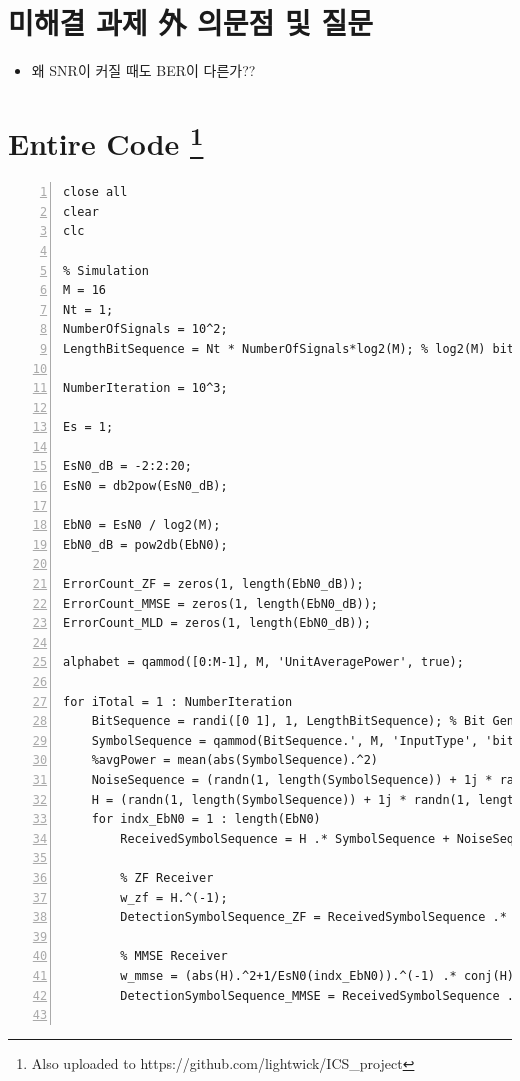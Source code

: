 \documentclass{article}
\begin{document}
\section{미해결 과제 外 의문점 및 질문}
\begin{itemize}
  \item{왜 SNR이 커질 때도 BER이 다른가??}
\end{itemize}
\section[Entire Code]{Entire Code \footnote{Also uploaded to https://github.com/lightwick/ICS\_project}}
\begin{lstlisting}[style=Matlab-editor, frame=single, numbers=left,]
close all
clear
clc

% Simulation
M = 16
Nt = 1;
NumberOfSignals = 10^2;
LengthBitSequence = Nt * NumberOfSignals*log2(M); % log2(M) bits per signal

NumberIteration = 10^3;

Es = 1;

EsN0_dB = -2:2:20;
EsN0 = db2pow(EsN0_dB);

EbN0 = EsN0 / log2(M);
EbN0_dB = pow2db(EbN0);

ErrorCount_ZF = zeros(1, length(EbN0_dB));
ErrorCount_MMSE = zeros(1, length(EbN0_dB));
ErrorCount_MLD = zeros(1, length(EbN0_dB));

alphabet = qammod([0:M-1], M, 'UnitAveragePower', true);

for iTotal = 1 : NumberIteration
    BitSequence = randi([0 1], 1, LengthBitSequence); % Bit Generation (BitSequence = rand(1, LengthBitSequence) > 0.5;)
    SymbolSequence = qammod(BitSequence.', M, 'InputType', 'bit', 'UnitAveragePower', 1).';
    %avgPower = mean(abs(SymbolSequence).^2)
    NoiseSequence = (randn(1, length(SymbolSequence)) + 1j * randn(1, length(SymbolSequence))) / sqrt(2); % Noise (n) Generation
    H = (randn(1, length(SymbolSequence)) + 1j * randn(1, length(SymbolSequence))) ./ sqrt(2); % Channel (h) Generation
    for indx_EbN0 = 1 : length(EbN0)
        ReceivedSymbolSequence = H .* SymbolSequence + NoiseSequence * sqrt(1 / EsN0(indx_EbN0)); % Received Signal (y = s + n) Generation

        % ZF Receiver
        w_zf = H.^(-1);
        DetectionSymbolSequence_ZF = ReceivedSymbolSequence .* w_zf; % Detection (Zero-Forcing: y / h)

        % MMSE Receiver
        w_mmse = (abs(H).^2+1/EsN0(indx_EbN0)).^(-1) .* conj(H);
        DetectionSymbolSequence_MMSE = ReceivedSymbolSequence .* w_mmse;;
        

\end{lstlisting}
\end{document}
